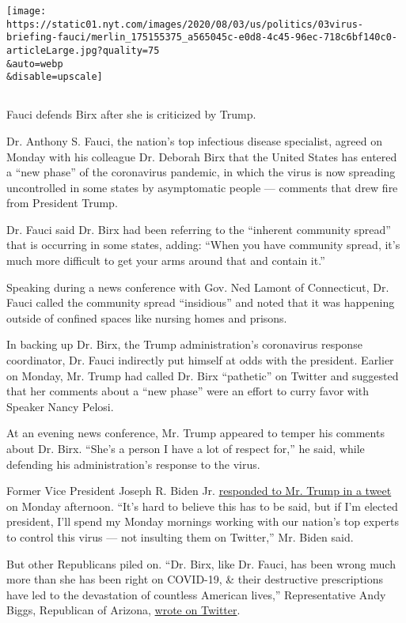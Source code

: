 \texttt{[image: https://static01.nyt.com/images/2020/08/03/us/politics/03virus-briefing-fauci/merlin\_175155375\_a565045c-e0d8-4c45-96ec-718c6bf140c0-articleLarge.jpg?quality=75\\\&auto=webp\\\&disable=upscale]}

\subsection{}

Fauci defends Birx after she is criticized by Trump.

Dr. Anthony S. Fauci, the nation's top infectious disease specialist,
agreed on Monday with his colleague Dr. Deborah Birx that the United
States has entered a ``new phase'' of the coronavirus pandemic, in which
the virus is now spreading uncontrolled in some states by asymptomatic
people --- comments that drew fire from President Trump.

Dr. Fauci said Dr. Birx had been referring to the ``inherent community
spread'' that is occurring in some states, adding: ``When you have
community spread, it's much more difficult to get your arms around that
and contain it.''

Speaking during a news conference with Gov. Ned Lamont of Connecticut,
Dr. Fauci called the community spread ``insidious'' and noted that it
was happening outside of confined spaces like nursing homes and prisons.

In backing up Dr. Birx, the Trump administration's coronavirus response
coordinator, Dr. Fauci indirectly put himself at odds with the
president. Earlier on Monday, Mr. Trump had called Dr. Birx ``pathetic''
on Twitter and suggested that her comments about a ``new phase'' were an
effort to curry favor with Speaker Nancy Pelosi.

At an evening news conference, Mr. Trump appeared to temper his comments
about Dr. Birx. ``She's a person I have a lot of respect for,'' he said,
while defending his administration's response to the virus.

Former Vice President Joseph R. Biden Jr.
\href{https://twitter.com/JoeBiden/status/1290350721515139072}{responded
to Mr. Trump in a tweet} on Monday afternoon. ``It's hard to believe
this has to be said, but if I'm elected president, I'll spend my Monday
mornings working with our nation's top experts to control this virus ---
not insulting them on Twitter,'' Mr. Biden said.

But other Republicans piled on. ``Dr. Birx, like Dr. Fauci, has been
wrong much more than she has been right on COVID-19, \& their
destructive prescriptions have led to the devastation of countless
American lives,'' Representative Andy Biggs, Republican of Arizona,
\href{https://twitter.com/RepAndyBiggsAZ/status/1290297517582610433?s=20}{wrote
on Twitter}.

